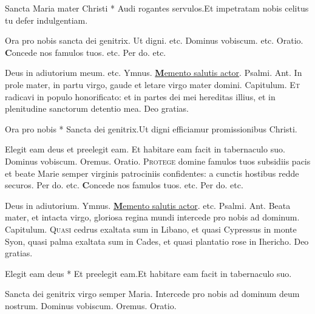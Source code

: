\begin{multicols*}{2}
\begin{responsory-breve}
{Sancta Maria mater Christi * Audi rogantes servulos.}{Et impetratam nobis celitus tu defer indulgentiam.}
\end{responsory-breve}
\V Ora pro nobis sancta dei genitrix. \R Ut digni. etc. Dominus vobiscum. etc. {\color{Red} Oratio.}
{\bfseries \color{Red} C}{oncede} nos famulos tuos. etc. Per do. etc.
{\color{Red} }
\par \noindent Deus in adiutorium meum. etc. {\color{Red} Ymnus.} \hyperlink{memento-salutis}{{\bfseries \color{Red} M}emento salutis actor}. {\color{Red} Psalmi.}
{\color{Red} Ant.} In prole mater, in partu virgo, gaude et letare virgo mater domini. {\color{Red} Capitulum.}
\lettrine[lines=2]{\zallmancaps \color{Red} E}{t} radicavi in populo honorificato: et in partes dei mei hereditas illius, et in plenitudine sanctorum detentio mea. Deo gratias.
\begin{responsory-breve}
{Ora pro nobis * Sancta dei genitrix.}{Ut digni efficiamur promissionibus Christi.}
\end{responsory-breve}
\V Elegit eam deus et preelegit eam. \R Et habitare eam facit in tabernaculo suo. Dominus vobiscum. Oremus. {\color{Red} Oratio.}
\lettrine[lines=2]{\zallmancaps \color{Blue} P}{rotege} domine famulos tuos subsidiis pacis et beate Marie semper virginis patrociniis confidentes: a cunctis hostibus redde securos. Per do. etc.
{\bfseries \color{Red} C}{oncede} nos famulos tuos. etc. Per do. etc.
{\color{Red} }
\par \noindent Deus in adiutorium. {\color{Red} Ymnus.} \hyperlink{memento-salutis}{{\bfseries \color{Red} M}emento salutis actor}. etc. {\color{Red} Psalmi.}
{\color{Red} Ant.} Beata mater, et intacta virgo, gloriosa regina mundi intercede pro nobis ad dominum. {\color{Red} Capitulum.}
\lettrine[lines=2]{\zallmancaps \color{Red} Q}{uasi} cedrus exaltata sum in Libano, et quasi Cypressus in monte Syon, quasi palma exaltata sum in Cades, et quasi plantatio rose in Ihericho. Deo gratias.
\begin{responsory-breve}
{Elegit eam deus * Et preelegit eam.}{Et habitare eam facit in tabernaculo suo.}
\end{responsory-breve}
\V Sancta dei genitrix virgo semper Maria. \R Intercede pro nobis ad dominum deum nostrum. Dominus vobiscum. {\color{Red} Oremus. Oratio.}

\end{multicols*}

